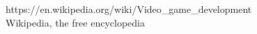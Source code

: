 
\begin{thebibliography}{x}

	
	{https://en.wikipedia.org/wiki/Video\_game\_development} \\
	Wikipedia, the free encyclopedia


\end{thebibliography}
